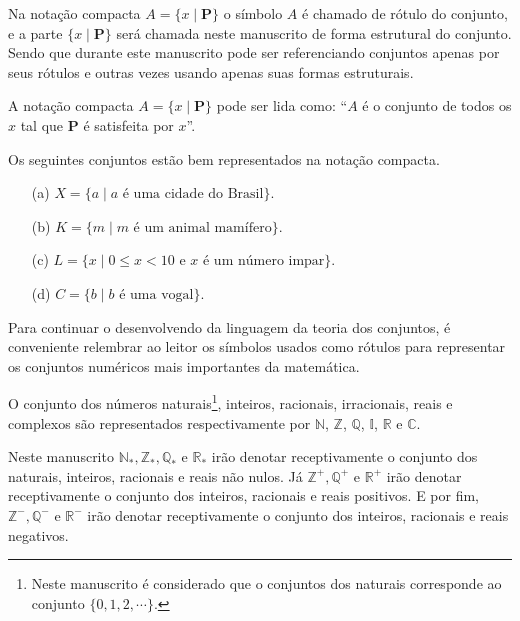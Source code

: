 \begin{remark}
	Na notação compacta $A = \{ x \mid \textbf{P}\}$ o símbolo $A$ é chamado de rótulo do conjunto, e a parte $\{ x \mid \textbf{P}\}$ será chamada neste manuscrito de forma estrutural do conjunto. Sendo que durante este manuscrito pode ser referenciando conjuntos apenas por seus rótulos e outras vezes usando apenas suas formas estruturais.
\end{remark}

\begin{remark}
	A notação compacta $A = \{ x \mid \textbf{P}\}$ pode ser lida como: ``$A$ é o conjunto de todos os $x$ tal que $\textbf{P}$ é satisfeita por $x$''.
\end{remark}

\begin{example}\label{exe:conjuntos}
	Os seguintes conjuntos estão bem representados na notação compacta.
	\begin{itemize}
		\item[(a)] $X = \{a \mid a \mbox{ é uma cidade do Brasil}\}$.
		\item[(b)] $K = \{m \mid m \mbox{ é um animal mamífero}\}$.
		\item[(c)] $L = \{x \mid 0 \leq x < 10 \mbox{ e } x \mbox{ é um número impar}\}$.
		\item[(d)] $C = \{b \mid b \mbox{ é uma vogal}\}$.
	\end{itemize}
\end{example}

Para continuar o desenvolvendo da linguagem da teoria dos conjuntos, é conveniente relembrar ao leitor os símbolos usados como rótulos para representar os conjuntos numéricos mais importantes da matemática.

\begin{definition}\label{def:SimbolosConjuntos}
	O conjunto dos números naturais\footnote{Neste manuscrito é considerado que o conjuntos dos naturais corresponde ao conjunto $\{0, 1, 2, \cdots\}$.}, inteiros, racionais, irracionais, reais e complexos são representados respectivamente por   $\mathbb{N}$, $\mathbb{Z}$,  $\mathbb{Q}$,  $\mathbb{I}$,  $\mathbb{R}$ e  $\mathbb{C}$.
\end{definition}

\begin{remark}
	Neste manuscrito $\mathbb{N}_*, \mathbb{Z}_*, \mathbb{Q}_*$ e $\mathbb{R}_*$ irão denotar receptivamente o conjunto dos naturais, inteiros, racionais e reais não nulos. Já $\mathbb{Z}^+, \mathbb{Q}^+$ e $\mathbb{R}^+$ irão denotar receptivamente o conjunto dos inteiros, racionais e reais positivos. E por fim, $\mathbb{Z}^-, \mathbb{Q}^-$ e $\mathbb{R}^-$ irão denotar receptivamente o conjunto dos inteiros, racionais e reais negativos.
\end{remark}

